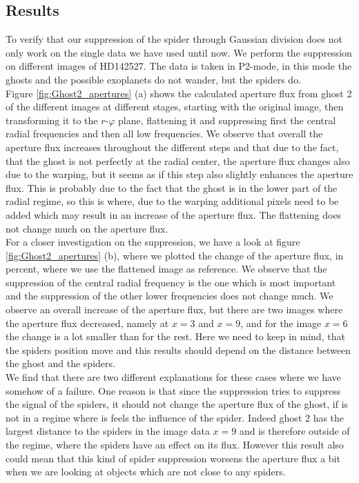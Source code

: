 \subsection{Results}
To verify that our suppression of the spider through Gaussian division does not only work on the single data we have used until now. We perform the suppression on different images of HD142527. The data is taken in P2-mode, in this mode the ghosts and the possible exoplanets do not wander, but the spiders do. \\
Figure \ref{fig:Ghost2_apertures} (a) shows the calculated aperture flux from ghost 2 of the different images at different stages, starting with the original image, then transforming it to the $r$-$\varphi$ plane, flattening it and suppressing first the central radial frequencies and then all low frequencies. We observe that overall the aperture flux increases throughout the different steps and that due to the fact, that the ghost is not perfectly at the radial center, the aperture flux changes also due to the warping, but it seems as if this step also slightly enhances the aperture flux. This is probably due to the fact that the ghost is in the lower part of the radial regime, so this is where, due to the warping additional pixels need to be added which may result in an increase of the aperture flux. The flattening does not change much on the aperture flux.\\
For a closer investigation on the suppression, we have a look at figure \ref{fig:Ghost2_apertures} (b), where we plotted the change of the aperture flux, in percent, where we use the flattened image as reference. We observe that the suppression of the central radial frequency is the one which is most important and the suppression of the other lower frequencies does not change much. We observe an overall increase of the aperture flux, but there are two images where the aperture flux decreased, namely at $x=3$ and $x=9$, and for the image $x=6$ the change is a lot smaller than for the rest. Here we need to keep in mind, that the spiders position move and this results should depend on the distance between the ghost and the spiders. \\
We find that there are two different explanations for these cases where we have somehow of a failure. One reason is that since the suppression tries to suppress the signal of the spiders, it should not change the aperture flux of the ghost, if is not in a regime where is feels the influence of the spider. Indeed ghost 2 has the largest distance to the spiders in the image data $x=9$ and is therefore outside of the regime, where the spiders have an effect on its flux. However this result also could mean that this kind of spider suppression worsens the aperture flux a bit when we are looking at objects which are not close to any spiders.\\
